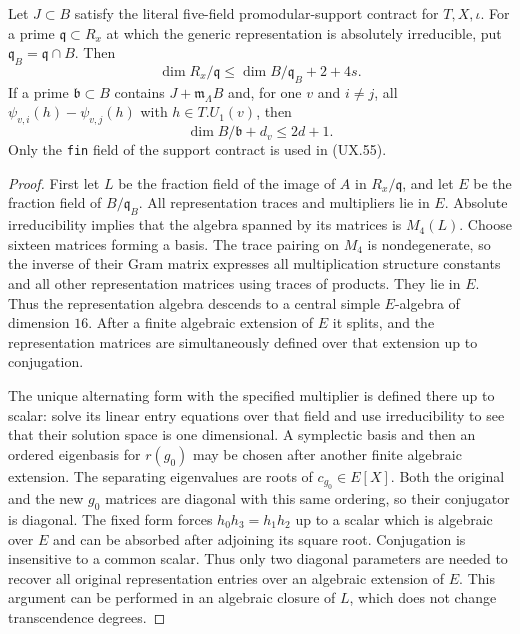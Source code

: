 \begin{proposition}
Let $J\subset B$ satisfy the literal five-field
promodular-support contract for $T,X,\iota$.
For a prime $\mathfrak q\subset R_x$ at which the
generic representation is absolutely irreducible,
put $\mathfrak q_B=\mathfrak q\cap B$.  Then
\[
       \dim R_x/\mathfrak q
             \le \dim B/\mathfrak q_B+2+4s .
 \tag{UX.54}
\]
If a prime $\mathfrak b\subset B$ contains
$J+\mathfrak m_\Lambda B$ and, for one $v$ and
$i\ne j$, all
$\psi_{v,i}(h)-\psi_{v,j}(h)$ with $h\in T.U_1(v)$,
then
\[
                    \dim B/\mathfrak b+d_v\le2d+1 .
 \tag{UX.55}
\]
Only the \texttt{fin} field of the support contract
is used in (UX.55).
\end{proposition}

\begin{proof}
First let $L$ be the fraction field of the image
of $A$ in $R_x/\mathfrak q$, and let $E$ be
the fraction field of $B/\mathfrak q_B$.
All representation traces and multipliers lie
in $E$.  Absolute irreducibility implies that
the algebra spanned by its matrices is $M_4(L)$.
Choose sixteen matrices forming a basis.  The
trace pairing on $M_4$ is nondegenerate, so
the inverse of their Gram matrix expresses
all multiplication structure constants and
all other representation matrices using
traces of products.  They lie in $E$.
Thus the representation algebra descends to
a central simple $E$-algebra of dimension $16$.
After a finite algebraic extension of $E$
it splits, and the representation matrices
are simultaneously defined over that
extension up to conjugation.

The unique alternating form with the
specified multiplier is defined there up
to scalar: solve its linear entry equations
over that field and use irreducibility
to see that their solution space is one
dimensional.  A symplectic basis and then
an ordered eigenbasis for $r(g_0)$ may be
chosen after another finite algebraic
extension.  The separating eigenvalues
are roots of $c_{g_0}\in E[X]$.  Both
the original and the new $g_0$ matrices
are diagonal with this same ordering,
so their conjugator is diagonal.
The fixed form forces
$h_0h_3=h_1h_2$ up to a scalar which
is algebraic over $E$ and can be
absorbed after adjoining its square
root.  Conjugation is insensitive to
a common scalar.  Thus only two
diagonal parameters are needed to
recover all original representation
entries over an algebraic extension
of $E$.  This argument can be performed
in an algebraic closure of $L$, which
does not change transcendence degrees.


\end{proof}
